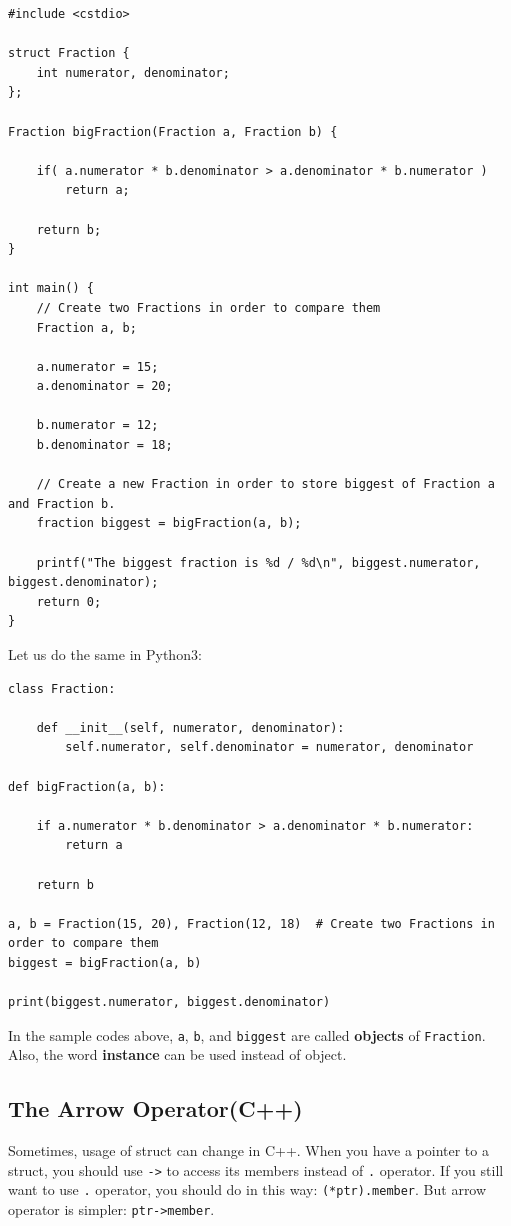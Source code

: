 \documentclass[12pt]{article}
\begin{document}
\begin{verbatim}
#include <cstdio>

struct Fraction {
    int numerator, denominator;
};

Fraction bigFraction(Fraction a, Fraction b) {

    if( a.numerator * b.denominator > a.denominator * b.numerator )
        return a;

    return b;
}

int main() {
    // Create two Fractions in order to compare them
    Fraction a, b;
    
    a.numerator = 15;
    a.denominator = 20;
    
    b.numerator = 12;
    b.denominator = 18;
    
    // Create a new Fraction in order to store biggest of Fraction a and Fraction b.
    fraction biggest = bigFraction(a, b);
    
    printf("The biggest fraction is %d / %d\n", biggest.numerator, biggest.denominator);
    return 0;
}
\end{verbatim}

\cleardoublepage
Let us do the same in Python3:

\begin{verbatim}
class Fraction:

    def __init__(self, numerator, denominator):
        self.numerator, self.denominator = numerator, denominator

def bigFraction(a, b):

    if a.numerator * b.denominator > a.denominator * b.numerator:
        return a

    return b

a, b = Fraction(15, 20), Fraction(12, 18)  # Create two Fractions in order to compare them
biggest = bigFraction(a, b)

print(biggest.numerator, biggest.denominator)
\end{verbatim}

In the sample codes above, \lstinline{a}, \lstinline{b}, and \lstinline{biggest} are called \textbf{objects} of \lstinline{Fraction}. Also, the word \textbf{instance} can be used instead of object.

\subsection{The Arrow Operator(C++)}
Sometimes, usage of struct can change in C++. When you have a pointer to a struct, you should use \lstinline{->} to access its members instead of \lstinline{.} operator. If you still want to use \lstinline{.} operator, you should do in this way: \lstinline{(*ptr).member}. But arrow operator is simpler: \lstinline{ptr->member}.
\end{document}
